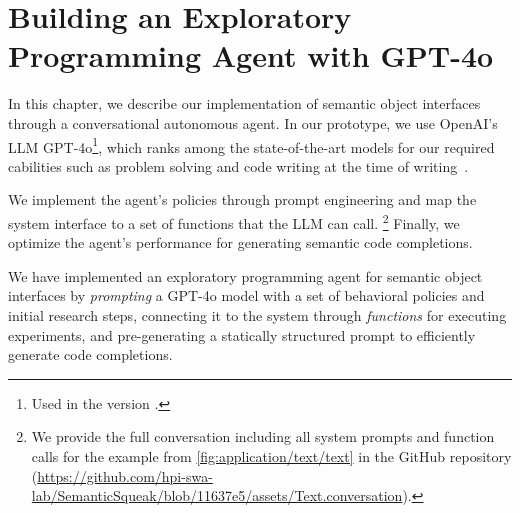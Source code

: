 
\chapter{Building an Exploratory Programming Agent with GPT-4o}
\label{cha:agent}

In this chapter, we describe our implementation of semantic object interfaces through a conversational autonomous agent.
In our prototype, we use OpenAI's LLM GPT-4o\footnote{Used in the version .}, which ranks among the state-of-the-art models for our required cabilities such as problem solving and code writing at the time of writing~\cite{openai2024gpt4}.

We implement the agent's policies through prompt engineering and map the system interface to a set of functions that the LLM can call.%
\footnote{We provide the full conversation including all system prompts and function calls for the example from \cref{fig:application/text/text} in the GitHub repository (\url{https://github.com/hpi-swa-lab/SemanticSqueak/blob/11637e5/assets/Text.conversation}).} %
Finally, we optimize the agent's performance for generating semantic code completions.



\begin{summary}
	We have implemented an exploratory programming agent for semantic object interfaces by \emph{prompting} a GPT-4o model with a set of behavioral policies and initial research steps, connecting it to the system through \emph{functions} for executing experiments, and pre-generating a statically structured prompt to efficiently generate code completions.
\end{summary}
